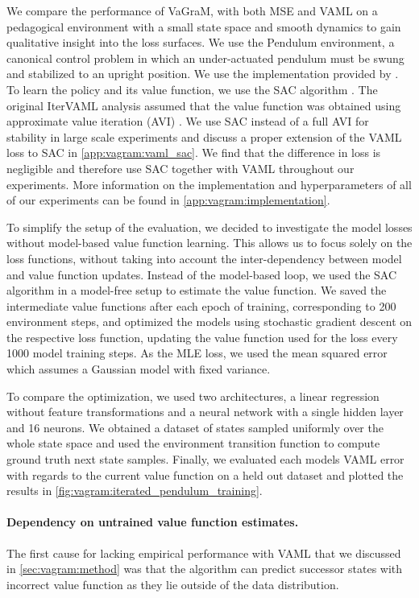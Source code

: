 We compare the performance of VaGraM, with both MSE and VAML on a pedagogical environment with a small state space and smooth dynamics to gain qualitative insight into the loss surfaces. 
We use the Pendulum environment, a canonical control problem in which an under-actuated pendulum must be swung and stabilized to an upright position.
We use the implementation provided by \cite{brockman2016openai}.
To learn the policy and its value function, we use the SAC algorithm \parencite{sac}.
The original IterVAML analysis assumed that the value function was obtained using approximate value iteration (AVI) \parencite{gordon1995stable,ernst2005tree,farahmand2010error}. We use SAC instead of a full AVI for stability in large scale experiments and discuss a proper extension of the VAML loss to SAC in \autoref{app:vagram:vaml_sac}. We find that the difference in loss is negligible and therefore use SAC together with VAML throughout our experiments.
More information on the implementation and hyperparameters of all of our experiments can be found in \autoref{app:vagram:implementation}. 

To simplify the setup of the evaluation, we decided to investigate the model losses without model-based value function learning.
This allows us to focus solely on the loss functions, without taking into account the inter-dependency between model and value function updates.
Instead of the model-based loop, we used the SAC algorithm in a model-free setup to estimate the value function.
We saved the intermediate value functions after each epoch of training, corresponding to 200 environment steps, and optimized the models using stochastic gradient descent on the respective loss function, updating the value function used for the loss every 1000 model training steps.
As the MLE loss, we used the mean squared error which assumes a Gaussian model with fixed variance.

To compare the optimization, we used two architectures, a linear regression without feature transformations and a neural network with a single hidden layer and 16 neurons.
We obtained a dataset of states sampled uniformly over the whole state space and used the environment transition function to compute ground truth next state samples.
Finally, we evaluated each models VAML error with regards to the current value function on a held out dataset and plotted the results in \autoref{fig:vagram:iterated_pendulum_training}.

\paragraph{Dependency on untrained value function estimates.}
The first cause for lacking empirical performance with VAML that we discussed in \autoref{sec:vagram:method} was that the algorithm can predict successor states with incorrect value function as they lie outside of the data distribution.

